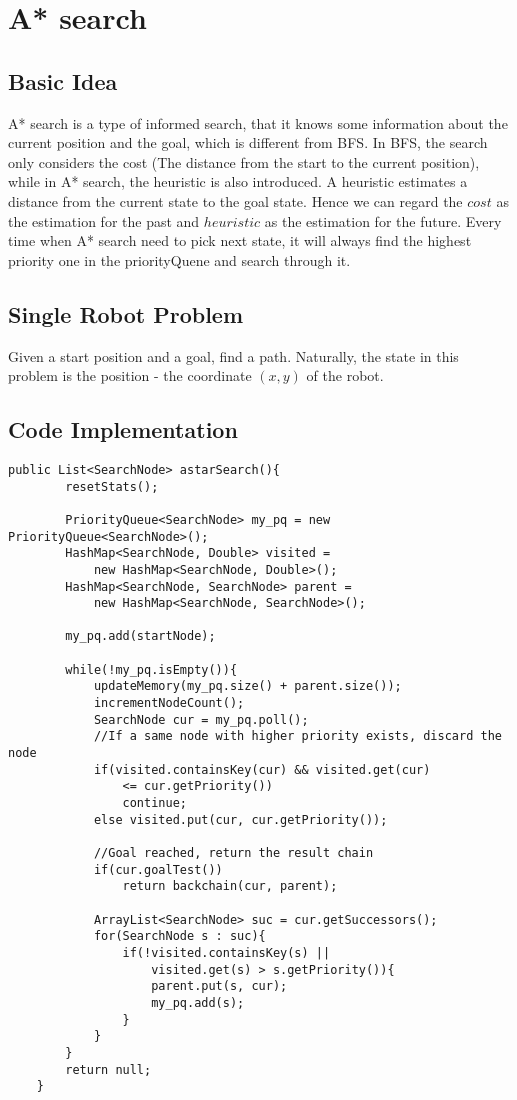 \documentclass{article}
\begin{document}
\section{A* search}
\subsection{Basic Idea}

A* search is a type of informed search, that it knows some information about the current position and the goal, which is different from BFS. In BFS, the search only considers the cost (The distance from the start to the current position), while in A* search, the heuristic is also introduced. A heuristic estimates a distance from the current state to the goal state. Hence we can regard the $cost$ as the estimation for the past and $heuristic$ as the estimation for the future. Every time when A* search need to pick next state, it will always find the highest priority one in the priorityQuene and search through it.

\subsection{Single Robot Problem}
Given a start position and a goal, find a path. Naturally, the state in this problem is the position - the coordinate $(x, y)$ of the robot.

\subsection{Code Implementation}
\begin{lstlisting}
public List<SearchNode> astarSearch(){
		resetStats();
		
		PriorityQueue<SearchNode> my_pq = new PriorityQueue<SearchNode>();
		HashMap<SearchNode, Double> visited = 
			new HashMap<SearchNode, Double>();
		HashMap<SearchNode, SearchNode> parent = 
			new HashMap<SearchNode, SearchNode>();
		
		my_pq.add(startNode);
		
		while(!my_pq.isEmpty()){
			updateMemory(my_pq.size() + parent.size());
			incrementNodeCount();
			SearchNode cur = my_pq.poll();
			//If a same node with higher priority exists, discard the node
			if(visited.containsKey(cur) && visited.get(cur) 
				<= cur.getPriority())
				continue;
			else visited.put(cur, cur.getPriority());
			
			//Goal reached, return the result chain
			if(cur.goalTest()) 
				return backchain(cur, parent);
			
			ArrayList<SearchNode> suc = cur.getSuccessors();
			for(SearchNode s : suc){
				if(!visited.containsKey(s) || 
					visited.get(s) > s.getPriority()){
					parent.put(s, cur);
					my_pq.add(s);
				}
			}	
		}
		return null;
	}
\end{lstlisting}
\end{document}
